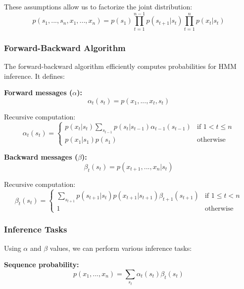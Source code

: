 \documentclass{article}
\begin{document}
These assumptions allow us to factorize the joint distribution:
\begin{equation}
    p(s_1,...,s_n,x_1,...,x_n) = p(s_1)\prod_{t=1}^{n-1}p(s_{t+1}|s_t)\prod_{t=1}^{n}p(x_t|s_t)
\end{equation}

\subsubsection{Forward-Backward Algorithm}
The forward-backward algorithm efficiently computes probabilities for HMM inference. It defines:

\textbf{Forward messages ($\alpha$):}
\begin{equation}
    \alpha_t(s_t) = p(x_1,...,x_t,s_t)
\end{equation}

Recursive computation:
\begin{equation}
    \alpha_t(s_t) = 
    \begin{cases}
        p(x_t|s_t) \sum_{s_{t-1}} p(s_t|s_{t-1})\alpha_{t-1}(s_{t-1}) & \text{if } 1 < t \leq n \\
        p(x_1|s_1)p(s_1) & \text{otherwise}
    \end{cases}
\end{equation}

\textbf{Backward messages ($\beta$):}
\begin{equation}
    \beta_t(s_t) = p(x_{t+1},...,x_n|s_t)
\end{equation}

Recursive computation:
\begin{equation}
    \beta_t(s_t) = 
    \begin{cases}
        \sum_{s_{t+1}} p(s_{t+1}|s_t)p(x_{t+1}|s_{t+1})\beta_{t+1}(s_{t+1}) & \text{if } 1 \leq t < n \\
        1 & \text{otherwise}
    \end{cases}
\end{equation}

\subsubsection{Inference Tasks}
Using $\alpha$ and $\beta$ values, we can perform various inference tasks:

\textbf{Sequence probability:}
\begin{equation}
    p(x_1,...,x_n) = \sum_{s_t} \alpha_t(s_t)\beta_t(s_t)
\end{equation}
\end{document}
